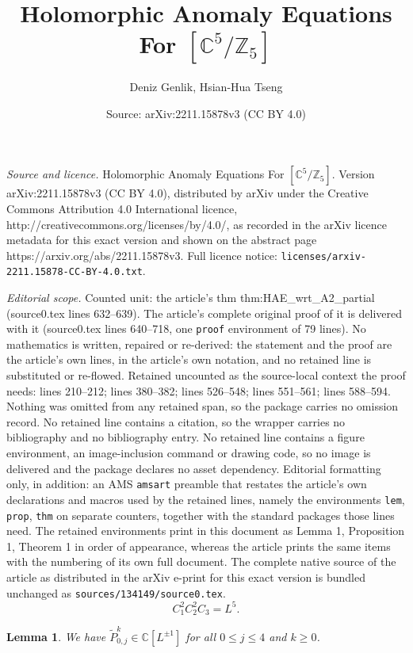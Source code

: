 \documentclass[10pt,a4paper]{amsart}
\title{Holomorphic Anomaly Equations For $[\mathbb{C}^5/\mathbb{Z}_5]$}
\author{Deniz Genlik, Hsian-Hua Tseng}
\date{Source: arXiv:2211.15878v3 (CC BY 4.0)}
\newtheorem{lem}{Lemma}
\begin{document}
\maketitle

\noindent\emph{Source and licence.} Holomorphic Anomaly Equations For $[\mathbb{C}^5/\mathbb{Z}_5]$. Version arXiv:2211.15878v3 (CC BY 4.0), distributed by arXiv under the Creative Commons Attribution 4.0 International licence, http://creativecommons.org/licenses/by/4.0/, as recorded in the arXiv licence metadata for this exact version and shown on the abstract page https://arxiv.org/abs/2211.15878v3. Full licence notice: \texttt{licenses/arxiv-2211.15878-CC-BY-4.0.txt}.\par\smallskip

\noindent\textit{Editorial scope.} Counted unit: the article's thm thm:HAE\_wrt\_A2\_partial (source0.tex lines 632--639). The article's complete original proof of it is delivered with it (source0.tex lines 640--718, one \texttt{proof} environment of 79 lines). No mathematics is written, repaired or re-derived: the statement and the proof are the article's own lines, in the article's own notation, and no retained line is substituted or re-flowed.  Retained uncounted as the source-local context the proof needs: lines 210--212; lines 380--382; lines 526--548; lines 551--561; lines 588--594.  Nothing was omitted from any retained span, so the package carries no omission record.  No retained line contains a citation, so the wrapper carries no bibliography and no bibliography entry.  No retained line contains a figure environment, an image-inclusion command or drawing code, so no image is delivered and the package declares no asset dependency.  Editorial formatting only, in addition: an AMS \texttt{amsart} preamble that restates the article's own declarations and macros used by the retained lines, namely the environments \texttt{lem}, \texttt{prop}, \texttt{thm} on separate counters, together with the standard packages those lines need.  The retained environments print in this document as Lemma 1, Proposition 1, Theorem 1 in order of appearance, whereas the article prints the same items with the numbering of its own full document.  The complete native source of the article as distributed in the arXiv e-print for this exact version is bundled unchanged as \texttt{sources/134149/source0.tex}.
\begin{equation}\label{eq:C12C22C3L5}
C_1^2C_2^2C_3=L^5.
\end{equation}

\begin{lem}\label{lem:P0jk_is_in_CLplusminus}
We have $\widetilde{P}_{0,j}^k\in\mathbb{C}[L^{\pm 1}]$ for all $0\leq{j}\leq{4}$ and $k\geq{0}$.
\end{lem}
\end{document}
